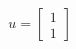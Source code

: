 \documentclass[preview]{standalone}
\begin{document}
\begin{align*}
u = \begin{bmatrix} 1 \\ 1 \end{bmatrix}
\end{align*}
\end{document}
